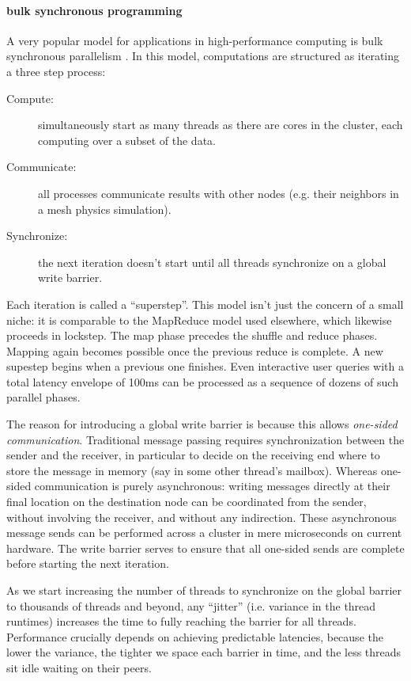 \documentclass[11pt]{article}
\begin{document}
\paragraph{bulk synchronous programming} A very popular model for
applications in high-performance computing is bulk synchronous
parallelism \cite{valiant_bridging_1990}. In this model, computations
are structured as iterating a three step process:
\begin{description}
\item[Compute:] simultaneously start as many threads as there are
  cores in the cluster, each computing over a subset of the data.
\item[Communicate:] all processes communicate results with other nodes
  (e.g. their neighbors in a mesh physics simulation).
\item[Synchronize:] the next iteration doesn't start until all threads
  synchronize on a global write barrier.
\end{description}
Each iteration is called a ``superstep''. This model isn't just the
concern of a small niche: it is comparable to the MapReduce model used
elsewhere, which likewise proceeds in lockstep. The map phase precedes
the shuffle and reduce phases. Mapping again becomes possible once the
previous reduce is complete. A new supestep begins when a previous one
finishes. Even interactive user queries with a total latency envelope
of 100ms can be processed as a sequence of dozens of such parallel
phases.

The reason for introducing a global write barrier is because this
allows {\em one-sided communication}. Traditional message passing
requires synchronization between the sender and the receiver, in
particular to decide on the receiving end where to store the message
in memory (say in some other thread's mailbox). Whereas one-sided
communication is purely asynchronous: writing messages directly at
their final location on the destination node can be coordinated from
the sender, without involving the receiver, and without any
indirection. These asynchronous message sends can be performed across
a cluster in mere microseconds on current hardware. The write barrier
serves to ensure that all one-sided sends are complete before starting
the next iteration.

As we start increasing the number of threads to synchronize on the
global barrier to thousands of threads and beyond, any ``jitter''
(i.e. variance in the thread runtimes) increases the time to fully
reaching the barrier for all threads. Performance crucially depends on
achieving predictable latencies, because the lower the variance, the
tighter we space each barrier in time, and the less threads sit idle
waiting on their peers.
\end{document}
